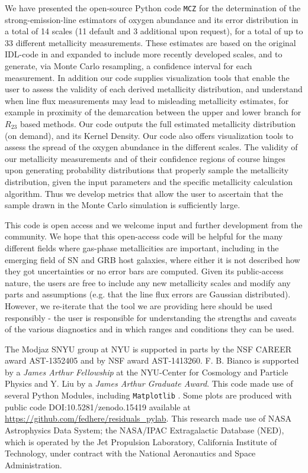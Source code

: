 \documentclass{emulateapj}
\begin{document}
We have presented the open-source Python code \verb=MCZ= for the determination of the strong-emission-line estimators of oxygen abundance and its error distribution in a total of 14 scales (11 default and 3 additional upon request), for a total of up to 33 different metallicity measurements. These estimates are based on the original IDL-code in \citet{kewley02} and expanded to include more recently developed scales, and to generate, via Monte Carlo resampling, a confidence interval for each measurement. In addition our code supplies visualization tools that enable the user to assess the validity of each derived metallicity distribution, and understand when line flux measurements may lead to misleading metallicity estimates, for example in proximity of the demarcation between the upper and lower branch for $R_{23}$ based methods.  Our code outputs the full estimated metallicity distribution (on demand), and its Kernel Density. Our code also offers  visualization tools to assess the spread of the oxygen abundance in the different scales. The validity of our metallicity measurements and of their confidence regions of course hinges upon generating probability distributions that properly sample the metallicity distribution, given the input parameters and the specific metallicity calculation algorithm. Thus we develop metrics that allow the user to ascertain that the sample drawn in the Monte Carlo simulation is sufficiently large. 

This code is open access and we welcome input and further development from the community.
We hope that this open-access code will be helpful for the many different fields where gas-phase metallicities are important, including in the emerging field of SN and GRB host galaxies, where either it is not described how they got uncertainties or no error bars are computed. Given its public-access nature, the users are free to include any new metallicity scales and modify any parts and assumptions (e.g. that the line flux errors are Gaussian distributed). However, we re-iterate that the tool we are providing here should be used responsibly - the user is responsible for understanding the strengths and caveats of the various diagnostics and in which ranges and conditions they can be used.


\acknowledgements
The Modjaz SNYU group at NYU is supported in parts by the NSF CAREER award AST-1352405 and by NSF award AST-1413260. F. B. Bianco is supported by a \emph{James Arthur Fellowship} at the NYU-Center for Cosmology and Particle Physics and Y. Liu by a \emph{James Arthur Graduate Award}.
This code made use of  several Python Modules, including \verb=Matplotlib= \citep{hunter07}.
Some plots are  produced with public code DOI:10.5281/zenodo.15419 available at \url{https://github.com/fedhere/residuals_pylab}.
This research made use of NASA Astrophysics Data
System; the NASA/IPAC Extragalactic Database (NED), which
is operated by the Jet Propulsion Laboratory, California Institute
of Technology, under contract with the National Aeronautics
and Space Administration.
\end{document}

